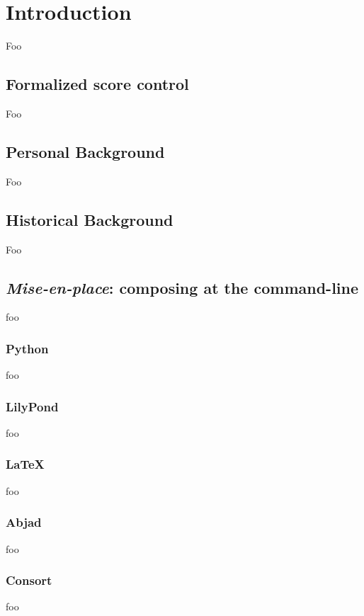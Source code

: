 \chapter{Introduction}

Foo

\section{Formalized score control}

Foo

\section{Personal Background}

Foo

\section{Historical Background}

Foo

\section{\emph{Mise-en-place}: composing at the command-line}

foo

\subsection{Python}

foo

\subsection{LilyPond}

foo

\subsection{LaTeX}

foo

\subsection{Abjad}

foo

\subsection{Consort}

foo
